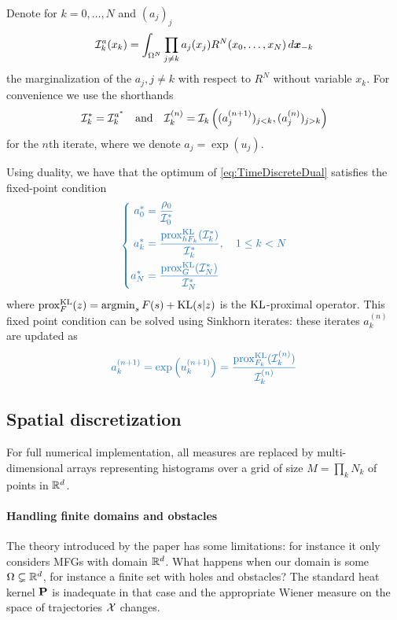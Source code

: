\documentclass[../report.tex]{subfiles}
\begin{document}
\begin{prop}\label{algo:Sinkhorn}
	Denote for $k=0,\ldots,N$ and $(a_j)_{j}$
	\[
	\mathcal{I}^a_k(x_k) = 
	\int_{\Omega^N}
	\prod_{j\neq k} a_j(x_j)
	R^N(x_0,\ldots,x_N)\,d\boldsymbol{x}_{-k}
	\]
	the marginalization of the $a_j,j\neq k$ with respect to $R^N$ without variable $x_k$.
	For convenience we use the shorthands
	\begin{align*}
	\mathcal{I}_k^* = \mathcal{I}_k^{a^*} \quad \text{and}\quad \mathcal{I}_k^{(n)} = \mathcal{I}_k\left((a^{(n+1)}_j)_{j<k},
	(a^{(n)}_j)_{j>k}\right)
	\end{align*}
	for the $n$th iterate, where we denote $a_j = \exp(u_j)$.
	
	Using duality, we have that the optimum of \eqref{eq:TimeDiscreteDual} satisfies the fixed-point condition
	\begin{equation*}\bluefont\left\{
	\begin{aligned}
		a^*_0 &= \frac{\rho_0}{\calI_0^*}  \\
		a^*_k &= \frac{\prox_{hF_k}^{\KL}(\calI_k^*)}{\calI_k^*}, \quad 1\leq k < N  \\
		a^*_N &= \frac{
			\prox_{G}^{\KL}(\calI_N^*)}{\calI_N^*
		}
	\end{aligned}\right.
	\end{equation*}
	where $\operatorname{prox}_F^{\operatorname{KL}}(z) = \operatorname*{argmin}_{s} F(s) + \operatorname{KL}(s|z)$ is the $\operatorname{KL}$-proximal operator.
	This fixed point condition can be solved using Sinkhorn iterates: these iterates $a_k^{(n)}$ are updated as
	\begin{equation}
	{\bluefont
	a_k^{(n+1)} = \exp\left(u^{(n+1)}_k\right) =
	\frac{
		\prox_{F_k}^{\KL}(\calI_k^{(n)})
	}{\calI_k^{(n)}}}
	\end{equation}
\end{prop}




\subsection{Spatial discretization}\label{sec:PartialDiscret}

For full numerical implementation, all measures are replaced by multi-dimensional arrays representing histograms over a grid of size $M = \prod_k N_k$ of points in $\mathbb{R}^d$.

\paragraph{Handling finite domains and obstacles}\label{sec:Finitedomainobstacles}
The theory introduced by the paper has some limitations: for instance it only considers MFGs with domain $\mathbb{R}^d$. What happens when our domain is some $\Omega \subsetneq \mathbb{R}^d$, for instance a finite set with holes and obstacles? The standard heat kernel $\mathbf{P}$ is inadequate in that case and the appropriate Wiener measure on the space of trajectories $\mathcal{X}$ changes.
\end{document}
